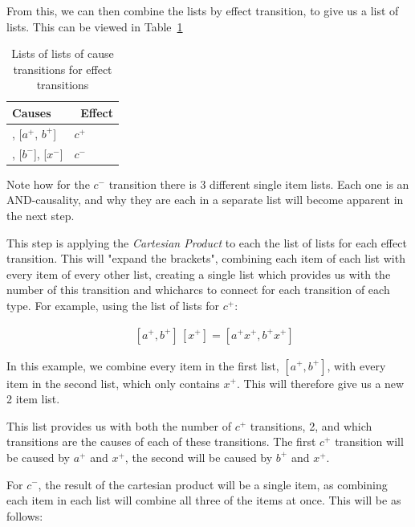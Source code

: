 \documentclass[british, journal]{IEEEtran}
\begin{document}
\noindent From this, we can then combine the lists by effect transition, to give us a list of lists.
This can be viewed in Table~\ref{tab:list-of-lists}

\begin{table}[h]
\caption{Lists of lists of cause transitions for effect transitions\label{tab:list-of-lists}}

  \centering
\begin{tabular}[htb]{| m{2.6cm} | m{2.0cm} |}
  \hline
Causes & \, Effect \\ \hline \hline
[$x^{+}$], [$a^{+}$, $b^{+}$] & $c^{+}$ \\ \hline
[$a^{-}$], [$b^{-}$], [$x^{-}$] & $c^{-}$ \\ \hline

  \end{tabular}
  \vspace{-1mm}
\end{table}

\noindent Note how for the $c^{-}$ transition there is 3 different single item 
lists. Each one is an AND-causality, and why they are each in a separate list
will become apparent in the next step. 

This step is applying the \emph{Cartesian Product} to each the list of lists
for each effect transition. This will "expand the brackets", combining each
item of each list with every item of every other list, creating a single list which
provides us with the number of this transition and  whicharcs to connect 
for each transition of each type. 
For example, using the list of lists for $c^{+}$:

\vspace{-3mm}
\[
\begin{array}{lcl}
~&[a^{+}, b^{+}]\, [x^{+}] = [a^{+} x^{+}, b^{+} x^{+}]
\end{array}
\]

\noindent In this example, we combine every item in the first list,
$[a^{+}, b^{+}]$, with every item in the second list, which only 
contains $x^{+}$. This will therefore give us a new 2 item list. 

This list provides us with both the number of $c^{+}$ transitions,
2, and which transitions are the causes of each of these transitions.
The first $c^{+}$ transition will be caused by $a^{+}$ and $x^{+}$,
the second will be caused by $b^{+}$ and $x^{+}$. 

For $c^{-}$, the result of the cartesian product will be a single item,
as combining each item in each list will combine all three of the items 
at once. This will be as follows:
\end{document}
